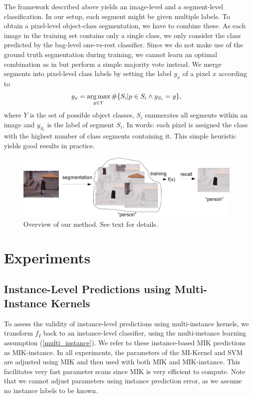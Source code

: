 The framework described above yields an image-level and a segment-level
classification. In our setup, each segment might be given multiple labels.
To obtain a pixel-level object-class segmentation, we have to combine these.
As each image in the training set contains only a single class, we only consider the class
predicted by the bag-level one-vs-rest classifier.
Since we do not make use of the ground truth segmentation during training, we cannot learn an optimal
combination as in \citet{li2010object} but perform a simple majority vote
instead.  We merge segments into pixel-level class labels by setting the label
$y_x$ of a pixel $x$ according to
\begin{equation}
    y_x = \operatorname*{arg\,max}_{y \in Y} \#\{S_i | p \in S_i \land y_{S_i}=y \},
\end{equation}
where $Y$ is the set of possible object classes, $S_i$ enumerates all segments within an
image and $y_{S_i}$ is the label of segment $S_i$. In words: each pixel is
assigned the class with the highest number of class segments containing it.
This simple heuristic yields good results in practice.

\begin{figure}[tbp]
	\begin{center}
        \includegraphics[width=\linewidth]{images/scheme-crop.pdf}
	\end{center}
        \caption{Overview of our method. See text for details.}
\end{figure}

\section{Experiments}

\subsection{Instance-Level Predictions using Multi-Instance Kernels}

To assess the validity of instance-level predictions using multi-instance
kernels, we transform $f_{I}$ back to an instance-level classifier, using the
multi-instance learning assumption (\eqref{multi_instance}). We refer to these
instance-based MIK predictions as MIK-instance. In all experiments, the
parameters of the MI-Kernel and SVM are adjusted using MIK and then used with
both MIK and MIK-instance.  This facilitates very fast parameter scans since
MIK is very efficient to compute. Note that we cannot adjust parameters using
instance prediction error, as we assume no instance labels to be known.

